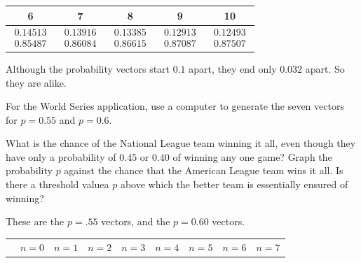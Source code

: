 \begin{exercises}
\begin{answer}
\begin{exparts}
\begin{center}
             \begin{tabular}{|ccccc}
               6  &7  &8  &9 &10 \\ 
               \hline
               $\begin{array}{c}  0.14513 \\ 0.85487  \end{array}$
               &$\begin{array}{c}  0.13916 \\ 0.86084  \end{array}$
               &$\begin{array}{c}  0.13385 \\ 0.86615  \end{array}$
               &$\begin{array}{c}  0.12913 \\ 0.87087  \end{array}$
               &$\begin{array}{c}  0.12493 \\ 0.87507  \end{array}$
             \end{tabular}
           \end{center}
          \partsitem Although the probability vectors start $0.1$ apart,
            they end only $0.032$ apart.
            So they are alike.
       \end{exparts}
     \end{answer}  
  \item 
    For the World Series application, use a computer to generate
    the seven vectors for $p=0.55$ and $p=0.6$.
    \begin{exparts}
      \partsitem What is the chance of the National League team winning it all,
        even though they have only a probability of $0.45$ or $0.40$ of
        winning any one game?
      \partsitem Graph the probability $p$ against the chance that the
        American League team wins it all.
        Is there a threshold value\Dash a $p$ above which the better team
        is essentially ensured of winning?
    \end{exparts}
    \begin{answer}
     These are the $p=.55$ vectors, and the $p=0.60$ vectors.
     \begin{center}\footnotesize
       \begin{tabular}{@{}r@{}cccccccc@{}}
         &$n=0$  &$n=1$  &$n=2$  &$n=3$  &$n=4$  &$n=5$  &$n=6$  &$n=7$  \\ 

\end{tabular}
\end{center}
\end{answer}
\end{exercises}
